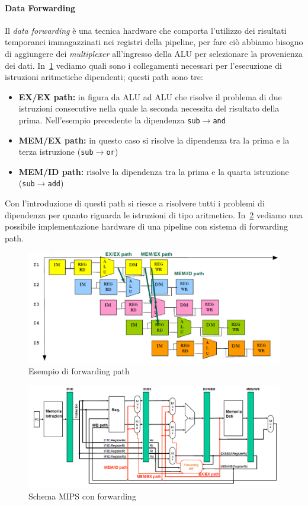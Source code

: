 \paragraph{Data Forwarding}
Il \emph{data forwarding} è una tecnica hardware che comporta l'utilizzo dei risultati temporanei immagazzinati nei registri della pipeline, per fare ciò abbiamo bisogno di aggiungere dei \emph{multiplexer} all'ingresso della ALU per selezionare la provenienza dei dati. In \figurename\,\ref{fig:forwardingpath} vediamo quali sono i collegamenti necessari per l'esecuzione di istruzioni aritmetiche dipendenti; questi path sono tre:
\begin{itemize}
\item\textbf{EX/EX path:} in figura da ALU ad ALU che risolve il problema di due istruzioni consecutive nella quale la seconda necessita del risultato della prima. Nell'esempio precedente la dipendenza \texttt{sub}$\rightarrow$\texttt{and}
\item\textbf{MEM/EX path:} in questo caso si risolve la dipendenza tra la prima e la terza istruzione (\texttt{sub}$\rightarrow$\texttt{or})
\item\textbf{MEM/ID path:} risolve la dipendenza tra la prima e la quarta istruzione (\texttt{sub}$\rightarrow$\texttt{add})
\end{itemize}
Con l'introduzione di questi path si riesce a risolvere tutti i problemi di dipendenza per quanto riguarda le istruzioni di tipo aritmetico.
In \figurename\,\ref{fig:forwardingcirc} vediamo una possibile implementazione hardware di una pipeline con sistema di forwarding path.
\begin{figure}[htb]
\centering
\includegraphics[scale=0.45]{img/forwardingpath.png}
\caption{Esempio di forwarding path}\label{fig:forwardingpath}
\end{figure}
\begin{figure}[htb]
\centering
\includegraphics[scale=0.7,angle=90]{img/forwardingcirc.png}
\caption{Schema MIPS con forwarding}\label{fig:forwardingcirc}
\end{figure}
